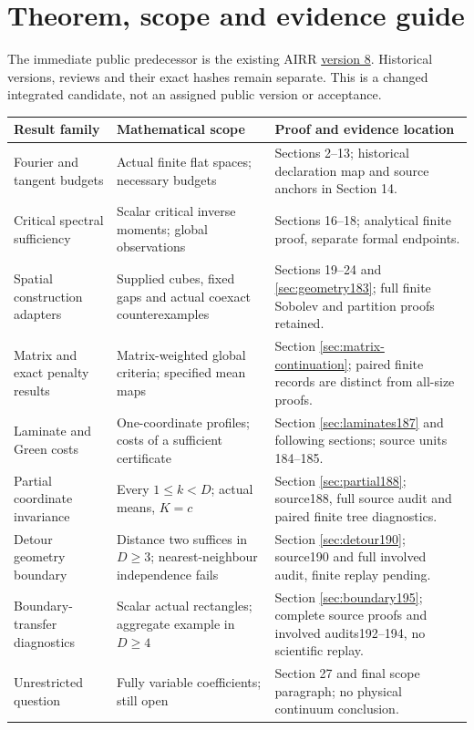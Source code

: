 \documentclass[11pt]{article}
\begin{document}
\section*{Theorem, scope and evidence guide}
The immediate public predecessor is the existing AIRR
\href{https://airr.science/papers/ARR-2026-7EPM3V3DP796BBRR/versions/v8/}{version 8}.
Historical versions, reviews and their exact hashes remain separate. This is a
changed integrated candidate, not an assigned public version or acceptance.
\begin{center}\small
\begin{tabular}{@{}p{}p{}p{}@{}}
\toprule
Result family & Mathematical scope & Proof and evidence location\\\midrule
Fourier and tangent budgets & Actual finite flat spaces; necessary budgets & Sections 2--13; historical declaration map and source anchors in Section 14.\\[5pt]
Critical spectral sufficiency & Scalar critical inverse moments; global observations & Sections 16--18; analytical finite proof, separate formal endpoints.\\[5pt]
Spatial construction adapters & Supplied cubes, fixed gaps and actual coexact counterexamples & Sections 19--24 and \ref{sec:geometry183}; full finite Sobolev and partition proofs retained.\\[5pt]
Matrix and exact penalty results & Matrix-weighted global criteria; specified mean maps & Section \ref{sec:matrix-continuation}; paired finite records are distinct from all-size proofs.\\[5pt]
Laminate and Green costs & One-coordinate profiles; costs of a sufficient certificate & Section \ref{sec:laminates187} and following sections; source units 184--185.\\[5pt]
Partial coordinate invariance & Every $1\le k<D$; actual means, $K=c$ & Section \ref{sec:partial188}; source188, full source audit and paired finite tree diagnostics.\\[5pt]
Detour geometry boundary & Distance two suffices in $D\ge3$; nearest-neighbour independence fails & Section \ref{sec:detour190}; source190 and full involved audit, finite replay pending.\\[5pt]
Boundary-transfer diagnostics & Scalar actual rectangles; aggregate example in $D\ge4$ & Section \ref{sec:boundary195}; complete source proofs and involved audits192--194, no scientific replay.\\[5pt]
Unrestricted question & Fully variable coefficients; still open & Section 27 and final scope paragraph; no physical continuum conclusion.\\
\bottomrule
\end{tabular}
\end{center}
\end{document}
